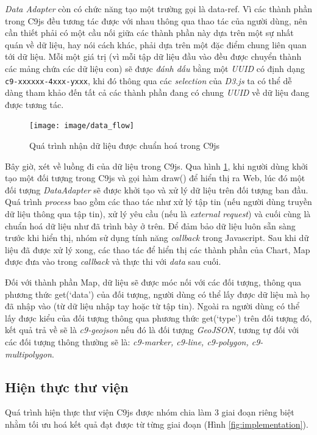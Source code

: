 \documentclass[12pt,a4paper,twoside]{article}
\begin{document}
\textit{Data Adapter} còn có chức năng tạo một trường gọi là \textsf{data-ref}. Vì các thành phần trong C9js đều tương tác được với nhau thông qua thao tác của người dùng, nên cần thiết phải có một cầu nối giữa các thành phần này dựa trên một sự nhất quán về dữ liệu, hay nói cách khác, phải dựa trên một đặc điểm chung liên quan tới dữ liệu. Mỗi một giá trị (vì mỗi tập dữ liệu đầu vào đều được chuyển thành các mảng chứa các dữ liệu con) sẽ được \textit{đánh dấu} bằng một \textit{UUID}\cite{uuid} có định dạng \texttt{c9-xxxxxx-4xxx-yxxx}, khi đó thông qua các \textit{selection} của \textit{D3.js} ta có thể dễ dàng tham khảo đến tất cả các thành phần đang có chung \textit{UUID} về dữ liệu đang được tương tác.

\begin{figure}[!h]
	\begin{center}
    \texttt{[image: image/data\_flow]}
    \caption{Quá trình nhận dữ liệu được chuẩn hoá trong C9js}
    \label{fig:data_flow}
	\end{center}
\end{figure}

Bây giờ, xét về luồng đi của dữ liệu trong C9js. Qua hình \ref{fig:data_flow}, khi người dùng khởi tạo một đối tượng trong C9js và gọi hàm \textsf{draw()} để hiển thị ra Web, lúc đó một đối tượng \textit{DataAdapter} sẽ được khởi tạo và xử lý dữ liệu trên đối tượng ban đầu. Quá trình \textit{process} bao gồm các thao tác như xử lý tập tin (nếu người dùng truyền dữ liệu thông qua tập tin), xử lý yêu cầu (nếu là \textit{external request}) và cuối cùng là chuẩn hoá dữ liệu như đã trình bày ở trên. Để đảm bảo dữ liệu luôn sẵn sàng trước khi hiển thị, nhóm sử dụng tính năng \textit{callback}\cite{callback} trong Javascript. Sau khi dữ liệu đã được xử lý xong, các thao tác để hiển thị các thành phần của Chart, Map được đưa vào trong \textit{callback} và thực thi với \textit{data} sau cuối.

Đối với thành phần Map, dữ liệu sẽ được móc nối với các đối tượng, thông qua phương thức \textsf{get(‘data’)} của đối tượng, người dùng có thể lấy được dữ liệu mà họ đã nhập vào (từ dữ liệu nhập tay hoặc từ tập tin). Ngoài ra người dùng có thể lấy được kiểu của đối tượng thông qua phương thức \textsf{get(‘type’)} trên đối tượng đó, kết quả trả về sẽ là \textit{c9-geojson} nếu đó là đối tượng \textit{GeoJSON}, tương tự đối với các đối tượng thông thường sẽ là: \textit{c9-marker, c9-line, c9-polygon, c9-multipolygon}.

\subsection{Hiện thực thư viện}
Quá trình hiện thực thư viện C9js được nhóm chia làm 3 giai đoạn riêng biệt nhằm tối ưu hoá kết quả đạt được từ từng giai đoạn (Hình \ref{fig:implementation}).
\end{document}
